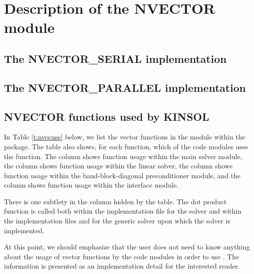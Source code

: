 \chapter{Description of the NVECTOR module}\label{s:nvector}


\section{The NVECTOR\_SERIAL implementation}\label{ss:nvec_ser}


\section{The NVECTOR\_PARALLEL implementation}\label{ss:nvec_par}


\section{NVECTOR functions used by KINSOL}

In Table \ref{t:nvecuse} below, we list the vector functions in the 
{\nvector} module within the {\kinsol} package.
The table also shows, for each function, which of the code modules uses
the function. The {\kinsol} column shows function usage within the main
solver module, the {\kinspgmr} column shows function usage
within the linear solver, the {\kinbbdpre} column shows function
usage within the band-block-diagonal preconditioner module, and the {\fkinsol}
column shows function usage within the {\fkinsol} interface module.

There is one subtlety in the {\kinspgmr} column hidden by the table. 
The dot product function  is called both within the 
implementation file  for the {\kinspgmr} solver and within 
the implementation files  and  for the generic {\spgmr} 
solver upon which the {\kinspgmr} solver is implemented.

At this point, we should emphasize that the {\kinsol} user does not need to know 
anything about the usage of vector functions by the {\kinsol} code modules in order 
to use {\kinsol}. The information is presented as an implementation detail for the 
interested reader.

